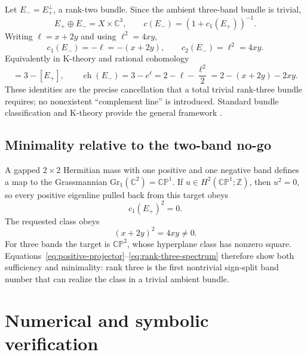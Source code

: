 \documentclass[11pt]{article}
\theoremstyle{definition}
\theoremstyle{remark}
\newcommand{\CC}{\mathbb C}
\newcommand{\ZZ}{\mathbb Z}
\newcommand{\CP}{\mathbb {CP}}
\newcommand{\ch}{\operatorname{ch}}
\begin{document}
Let \(E_-=E_+^\perp\), a rank-two bundle.  Since the ambient three-band
bundle is trivial,
\begin{equation}
 E_+\oplus E_-=X\times\CC^3,
 \qquad c(E_-)=(1+c_1(E_+))^{-1}.
\end{equation}
Writing \(\ell=x+2y\) and using \(\ell^2=4xy\),
\begin{equation}
 c_1(E_-)=-\ell=-(x+2y),
 \qquad c_2(E_-)=\ell^2=4xy.
 \label{eq:complement-chern}
\end{equation}
Equivalently in K-theory and rational cohomology
\begin{equation}
 [E_-]=3-[E_+],
 \qquad
 \ch(E_-)=3-e^\ell=2-\ell-\frac{\ell^2}{2}
 =2-(x+2y)-2xy .
 \label{eq:k-theory}
\end{equation}
These identities are the precise cancellation that a total trivial rank-three
bundle requires; no nonexistent ``complement line'' is introduced.  Standard
bundle classification and K-theory provide the general framework
\cite{Atiyah1989APE7,Hatcher2017APE7}.

\subsection{Minimality relative to the two-band no-go}

A gapped \(2\times2\) Hermitian mass with one positive and one negative band
defines a map to the Grassmannian
\(\mathrm{Gr}_1(\CC^2)=\CP^1\).  If \(u\in H^2(\CP^1;\ZZ)\), then
\(u^2=0\), so every positive eigenline pulled back from this target obeys
\[
 c_1(E_+)^2=0.
\]
The requested class obeys
\[
 (x+2y)^2=4xy\ne0.
\]
For three bands the target is \(\CP^2\), whose hyperplane class has nonzero
square.  Equations~\eqref{eq:positive-projector}--\eqref{eq:rank-three-spectrum}
therefore show both sufficiency and minimality: rank three is the first
nontrivial sign-split band number that can realize the class in a trivial
ambient bundle.

\section{Numerical and symbolic verification}
\end{document}
